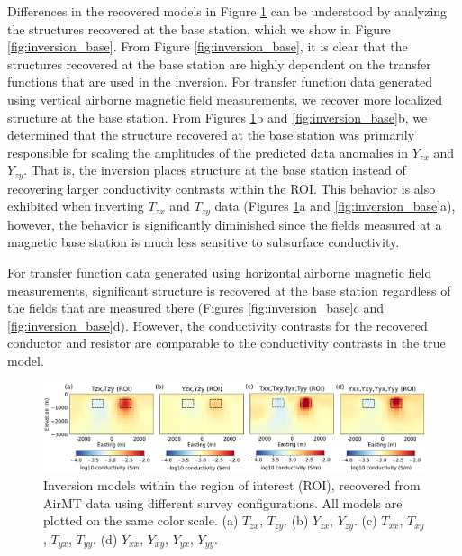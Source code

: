 \documentclass{segabs}
\begin{document}
Differences in the recovered models in Figure \ref{fig:inversion} can be understood by analyzing the structures recovered at the base station, which we show in Figure \ref{fig:inversion_base}. From Figure \ref{fig:inversion_base}, it is clear that the structures recovered at the base station are highly dependent on the transfer functions that are used in the inversion. For transfer function data generated using vertical airborne magnetic field measurements, we recover more localized structure at the base station. From Figures \ref{fig:inversion}b and \ref{fig:inversion_base}b, we determined that the structure recovered at the base station was primarily responsible for scaling the amplitudes of the predicted data anomalies in $Y_{zx}$ and $Y_{zy}$. That is, the inversion places structure at the base station instead of recovering larger conductivity contrasts within the ROI. This behavior is also exhibited when inverting $T_{zx}$ and $T_{zy}$ data (Figures \ref{fig:inversion}a and \ref{fig:inversion_base}a), however, the behavior is significantly diminished since the fields measured at a magnetic base station is much less sensitive to subsurface conductivity.

For transfer function data generated using horizontal airborne magnetic field measurements, significant structure is recovered at the base station regardless of the fields that are measured there (Figures \ref{fig:inversion_base}c and \ref{fig:inversion_base}d). However, the conductivity contrasts for the recovered conductor and resistor are comparable to the conductivity contrasts in the true model.

\begin{figure}
\includegraphics[width=2\columnwidth]{images/inversion.png}
\vspace{-8pt}
\caption{Inversion models within the region of interest (ROI), recovered from AirMT data using different survey configurations. All models are plotted on the same color scale. (a) $T_{zx}$, $T_{zy}$. (b) $Y_{zx}$, $Y_{zy}$. (c) $T_{xx}$, $T_{xy}$, $T_{yx}$, $T_{yy}$. (d) $Y_{xx}$, $Y_{xy}$, $Y_{yx}$, $Y_{yy}$.}
\label{fig:inversion}
\end{figure}
\end{document}
